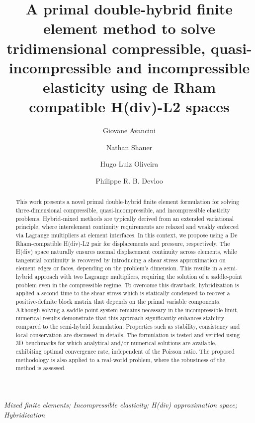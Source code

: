 \documentclass[english,11pt,3p,number,sort&compress]{elsarticle}
\begin{document}
\begin{frontmatter}{}

\title{A primal double-hybrid finite element method to solve tridimensional compressible, quasi-incompressible and incompressible elasticity using de Rham compatible H(div)-L2 spaces}

\author[uni]{Giovane Avancini}


\author[uni]{Nathan Shauer}


\author[uni]{Hugo Luiz Oliveira}


\author[uni]{Philippe R. B. Devloo}


\address[uni]{Universidade Estadual de Campinas, R. Josiah Willard Gibbs 85 - Cidade Universitaria, Campinas SP, Brazil, CEP 13083-839}

\begin{abstract}
	This work presents a novel primal double-hybrid finite element formulation for solving three-dimensional compressible, quasi-incompressible, and incompressible elasticity problems. Hybrid-mixed methods are typically derived from an extended variational principle, where interelement continuity requirements are relaxed and weakly enforced via Lagrange multipliers at element interfaces. In this context, we propose using a De Rham-compatible H(div)-L2 pair for displacements and pressure, respectively. The H(div) space naturally ensures normal displacement continuity across elements, while tangential continuity is recovered by introducing a shear stress approximation on element edges or faces, depending on the problem's dimension. This results in a semi-hybrid approach with two Lagrange multipliers, requiring the solution of a saddle-point problem even in the compressible regime. To overcome this drawback, hybridization is applied a second time to the shear stress which is statically condensed to recover a positive-definite block matrix that depends on the primal variable components. Although solving a saddle-point system remains necessary in the incompressible limit, numerical results demonstrate that this approach significantly enhances stability compared to the semi-hybrid formulation. Properties such as stability, consistency and local conservation are discussed in details. The formulation is tested and verified using 3D benchmarks for which analytical and/or numerical solutions are available, exhibiting optimal convergence rate, independent of the Poisson ratio. The proposed methodology is also applied to a real-world problem, where the robustness of the method is assessed.
\end{abstract}
\begin{keyword}
\textit{Mixed finite elements; Incompressible elasticity; H(div) approximation space; Hybridization}
\end{keyword}

\end{frontmatter}{}
\end{document}
